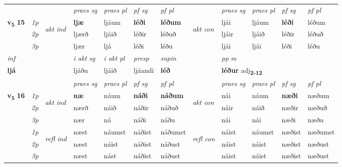 \begin{longtable}[l]{X>{\footnotesize\itshape}llXXXXlXXXX}
\midrule

 & &   & \textit{praes sg}  & \textit{praes pl}    & \textit{ pf sg} & \textit{pf pl} & & \textit{praes sg}  & \textit{praes pl}    & \textit{pf sg} & \textit{pf pl }  \\ \cmidrule{4-7} \cmidrule{9-12}
 \multirow{2}{*}{{{\textbf{v{\textsubscript{5}}} \Large{\textbf{15}}}}}  & 1p & \multirow{3}{*}{\begin{turn}{90}\textit{akt ind}\end{turn}} & \textbf{ljæ} & ljáum & \textbf{léði} & \textbf{léðum} & \multirow{3}{*}{\begin{turn}{90}\textit{akt con}\end{turn}} &ljái & ljáum & \textbf{léði} & léðum\\*
 & 2p &  &  ljærð  & ljáið & léðir & léðuð & & ljáir & ljáið & léðir & léðuð \\*
 & 3p &  & ljær & ljá & léði & léðu & & ljái & ljái& léði & léðu \\*
\cmidrule{4-7} \cmidrule{9-12}

   {\textit{inf}} & &  & \textit{i akt sg} & \textit{i akt pl}   & \textit{presp} & \textit{supin}  && \textit{pp m} \\*
  {\textbf{ljá}} & && ljáðu  & ljáið   & ljáandi &  \textbf{léð}  && \multicolumn{2}{l}{\textbf{léður} adj\textbf{\textsubscript{2-12}}} \\*

\midrule

 & &   & \textit{praes sg}  & \textit{praes pl}    & \textit{ pf sg} & \textit{pf pl} & & \textit{praes sg}  & \textit{praes pl}    & \textit{pf sg} & \textit{pf pl }  \\ \cmidrule{4-7} \cmidrule{9-12}
 \multirow{2}{*}{{{\textbf{v{\textsubscript{5}}} \Large{\textbf{16}}}}}  & 1p & \multirow{3}{*}{\begin{turn}{90}\textit{akt ind}\end{turn}} & \textbf{næ} & náum & \textbf{náði} & \textbf{náðum} & \multirow{3}{*}{\begin{turn}{90}\textit{akt con}\end{turn}} &nái & náum & \textbf{næði} & næðum\\*
 & 2p &  &  nærð  & náið & náðir & náðuð & & náir & náið & næðir & næðuð \\*
 & 3p &  & nær & ná & náði & náðu & & nái & nái& næði & næðu \\*
\cmidrule{4-7} \cmidrule{9-12}
 & 1p & \multirow{3}{*}{\begin{turn}{90}\textit{refl ind}\end{turn}}  & næst & náumst & náðist & náðumst & \multirow{3}{*}{\begin{turn}{90}\textit{refl con}\end{turn}}  &náist & náumst & næðist & næðumst \\*
 & 2p &  & næst & náist & náðist & náðust & &náist & náist & næðist & næðust \\*
 & 3p  & & næst & nást & náðist & náðust & & náist & náist& næðist & næðust \\*
\cmidrule{4-7} \cmidrule{9-12}


\end{longtable}
